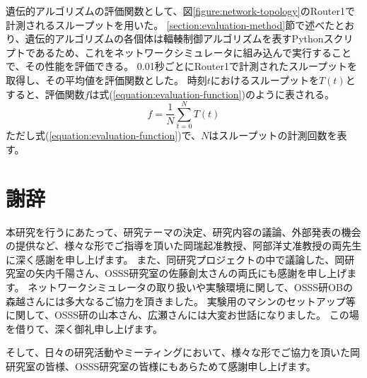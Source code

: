 \documentclass[a4paper,11pt]{jreport}
\newcommand{\figref}[1]{図\ref{#1}}
\newcommand{\secref}[1]{\ref{#1}節}
\newcommand{\equationref}[1]{式(\ref{#1})}
\begin{document}
遺伝的アルゴリズムの評価関数として、\figref{figure:network-topology}のRouter1で計測されるスループットを用いた。
\secref{section:evaluation-method}で述べたとおり、遺伝的アルゴリズムの各個体は輻輳制御アルゴリズムを表すPythonスクリプトであるため、これをネットワークシミュレータに組み込んで実行することで、その性能を評価できる。
0.01秒ごとにRouter1で計測されたスループットを取得し、その平均値を評価関数とした。
時刻$t$におけるスループットを$T(t)$とすると、評価関数$f$は\equationref{equation:evaluation-function}のように表される。
\begin{equation}
  \label{equation:evaluation-function}
  f = \frac{1}{N} \sum_{t=0}^{N} T(t)
\end{equation}
ただし\equationref{equation:evaluation-function}で、$N$はスループットの計測回数を表す。

\newpage

\chapter*{謝辞}

本研究を行うにあたって、研究テーマの決定、研究内容の議論、外部発表の機会の提供など、様々な形でご指導を頂いた岡瑞起准教授、阿部洋丈准教授の両先生に深く感謝を申し上げます。
また、同研究プロジェクトの中で議論した、岡研究室の矢内千陽さん、OSSS研究室の佐藤創太さんの両氏にも感謝を申し上げます。
ネットワークシミュレータの取り扱いや実験環境に関して、OSSS研OBの森越さんには多大なるご協力を頂きました。
実験用のマシンのセットアップ等に関して、OSSS研の山本さん、広瀬さんには大変お世話になりました。
この場を借りて、深く御礼申し上げます。

そして、日々の研究活動やミーティングにおいて、様々な形でご協力を頂いた岡研究室の皆様、OSSS研究室の皆様にもあらためて感謝申し上げます。

\newpage

\renewcommand{\bibname}{参考文献}



\end{document}
